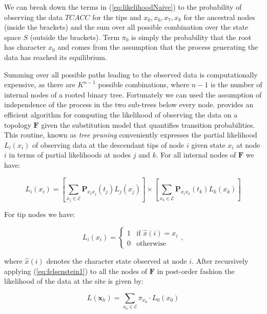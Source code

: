 \documentclass[12pt,twoside]{mitthesis}
\theoremstyle{plain}
\theoremstyle{definition}
\theoremstyle{remark}
\begin{document}
We can break down the terms in (\ref{eq:likelihoodNaive}) to the probability of observing the data $TCACC$ for the tips and $x_{0},x_{6},x_{7},x_{8}$ for the ancestral nodes (inside the brackets) and the sum over all possible combination over the state space $S$ (outside the brackets).
Term $\pi_{0}$ is simply the probability that the root has character $x_{0}$ and comes from the assumption that the process generating the data has reached its equilibrium.

Summing over all possible paths leading to the observed data is computationally expensive, as there are  $K^{n-1}$ possible combinations, where $n-1$ is the number of internal nodes of a rooted binary tree.
Fortunately we can used the assumption of independence of the process in the two sub-trees below every node.
\citet{Felsenstein1981} provides an efficient algorithm for computing the likelihood of observing the data on a topology $\mathbf{F}$ given the substitution model that quantifies transition probabilities.
This routine, known as \emph{tree pruning} conveniently expresses the partial likelihood $L_{i}(x_{i})$ of observing data at the descendant tips of node $i$ given state $x_{i}$ at node $i$ in terms of partial likelihoods at nodes $j$ and $k$.
For all internal nodes of $\mathbf{F}$ we have:

\begin{equation}
L_{i}(x_{i})=\left[\underset{x_{j}\in \mathcal{E}}{\sum}\mathbf{P}_{x_{i}x_{j}}(t_{j})L_{j}(x_{j})\right]\times\left[\underset{x_{k}\in \mathcal{E}}{\sum}\mathbf{P}_{x_{i}x_{k}}(t_{k})L_{k}(x_{k})\right]
\label{eq:felsenstein1}
\end{equation}

\noindent
For tip nodes we have:

\begin{equation}
L_{i}(x_{i})=\begin{cases}
1 & \text{if }\hat{x}(i)=x_{i}\\
0 & \text{otherwise}
\end{cases},
\label{eq:felsenstein2}
\end{equation}

\noindent
where $\hat{x}(i)$ denotes the character state observed at node $i$.
After recursively applying (\ref{eq:felsenstein1}) to all the nodes of $\mathbf{F}$ in post-order fashion the likelihood of the data at the site is given by:

\begin{equation}
L(\mathbf{x}_{h})=\underset{x_{0}\in\mathcal{E}}{\sum}\pi_{x_{0}}\cdot L_{0}(x_{0})
\label{eq:felsenstein3}
\end{equation}
\end{document}
